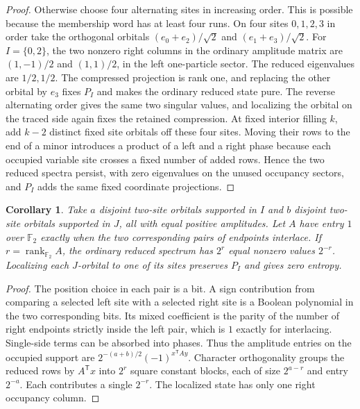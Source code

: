 \documentclass[11pt,reqno]{amsart}
\newtheorem{corollary}[theorem]{Corollary}
\theoremstyle{definition}
\theoremstyle{remark}
\numberwithin{equation}{section}
\begin{document}
\begin{proof}
Otherwise choose four alternating sites in increasing order.
This is possible because the membership word has at least four
runs. On four sites \(0,1,2,3\) in order take the orthogonal orbitals
\((e_0+e_2)/\sqrt2\) and \((e_1+e_3)/\sqrt2\).
For \(I=\{0,2\}\), the two nonzero right columns in the ordinary
amplitude matrix are \((1,-1)/2\) and \((1,1)/2\), in the
left one-particle sector. The reduced eigenvalues are \(1/2,1/2\).
The compressed projection is rank one, and replacing the other
orbital by \(e_3\) fixes \(P_I\) and makes the ordinary reduced
state pure. The reverse alternating order gives the same two singular values,
and localizing the orbital on the traced side again fixes the
retained compression. At fixed interior filling \(k\), add \(k-2\) distinct fixed
site orbitals off these four sites. Moving their rows to the end
of a minor introduces a product of a left and a right phase
because each occupied variable site crosses a fixed number of
added rows. Hence the two reduced spectra persist, with zero
eigenvalues on the unused occupancy sectors, and \(P_I\) adds the
same fixed coordinate projections.
\end{proof}

\begin{corollary}\label{m9:slater-pairs}
Take \(a\) disjoint two-site orbitals supported in \(I\) and
\(b\) disjoint two-site orbitals supported in \(J\), all with
equal positive amplitudes. Let \(A\) have entry \(1\) over
\(\mathbb F_2\) exactly when the two corresponding pairs of
endpoints interlace. If \(r=\operatorname{rank}_{\mathbb F_2}A\),
the ordinary reduced spectrum has \(2^r\) equal nonzero
values \(2^{-r}\). Localizing each \(J\)-orbital to one of its
sites preserves \(P_I\) and gives zero entropy.
\end{corollary}
\begin{proof}
The position choice in each pair is a bit. A sign contribution
from comparing a selected left site with a selected right site
is a Boolean polynomial in the two corresponding bits. Its
mixed coefficient is the parity of the number of right endpoints
strictly inside the left pair, which is \(1\) exactly for
interlacing. Single-side terms can be absorbed into phases.
Thus the amplitude entries on the occupied support are
\(2^{-(a+b)/2}(-1)^{x^{\mathsf T}Ay}\).
Character orthogonality groups the reduced rows by \(A^{\mathsf T}x\)
into \(2^r\) square constant blocks, each of size \(2^{a-r}\)
and entry \(2^{-a}\). Each contributes a single \(2^{-r}\).
The localized state has only one right occupancy column.
\end{proof}
\end{document}
